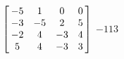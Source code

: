 {$\left[\hskip -3pt \begin{array}{cccc} -5&1&0&0\\  -3&-5&2&5
\\  -2&4&-3&4\\  5&4&-3&3\end {array}\hskip -3pt \right] 
$} 
{$-113$}

  

 

